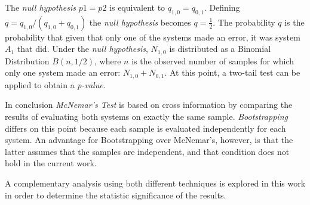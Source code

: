 The \textit{null hypothesis} $p1=p2$ is equivalent to $q_{1,0}=q_{0,1}$. Defining
$q=q_{1,0}/(q_{1,0}+q_{0,1})$ the \textit{null hypothesis} becomes $q=\frac{1}{2}$.
The probability $q$ is the probability that given that only one of the systems
made an error, it was system $A_{1}$ that did. Under the \textit{null hypothesis},
$N_{1,0}$ is distributed as a Binomial Distribution $B(n,1/2)$, where $n$ is
the observed number of samples for which only one system made an error: $N_{1,0}+N_{0,1}$.
At this point, a two-tail test can be applied to obtain a \textit{p-value}.

In conclusion \textit{McNemar's Test} is based on cross information by comparing the results of
evaluating both systems on exactly the same sample. \textit{Bootstrapping} differs on this
point because each sample is evaluated independently for each system.
An advantage for Bootstrapping over McNemar's, however,
is that the latter assumes that the samples are
independent, and that condition does not hold in the current work.

A complementary analysis using both different techniques is explored in this work
in order to determine the statistic significance of the results.

